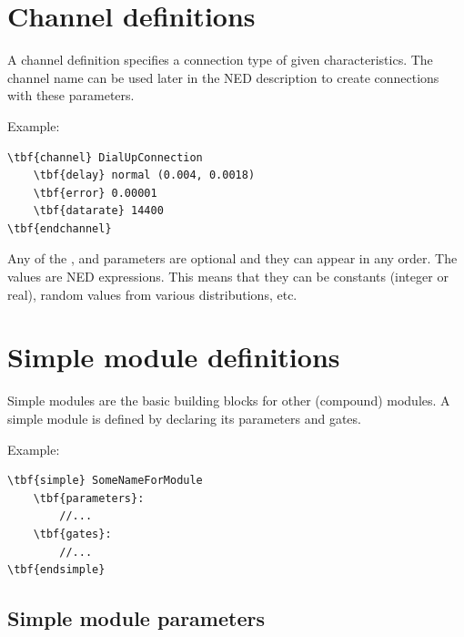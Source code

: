 \section{Channel definitions}


A channel definition specifies a connection type of given characteristics. 
The channel name can be used later in the NED description to 
create connections with these parameters.


Example:

\begin{Verbatim}[commandchars=\\\{\}]
\tbf{channel} DialUpConnection
    \tbf{delay} normal (0.004, 0.0018)
    \tbf{error} 0.00001
    \tbf{datarate} 14400
\tbf{endchannel}
\end{Verbatim}

Any of the ,  and  parameters
are optional and they can appear in any order. The values are NED
expressions.  This means that they can be
constants (integer or real), random values from various distributions,
etc.





\section{Simple module definitions}


Simple modules are the basic building blocks for other (compound)
modules. A simple module is defined by
declaring its parameters and
gates.

Example:

\begin{Verbatim}[commandchars=\\\{\}]
\tbf{simple} SomeNameForModule
    \tbf{parameters}:
        //...
    \tbf{gates}:
        //...
\tbf{endsimple}
\end{Verbatim}



\subsection{Simple module parameters}
\label{sec:ch-ned-lang:simple-module-param}


